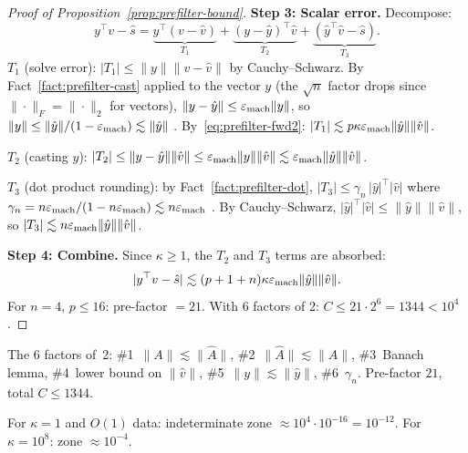 \begin{unverified}
\begin{proof}[Proof of Proposition~\ref{prop:prefilter-bound}]
\medskip\noindent\textbf{Step 3: Scalar error.}
Decompose:
\[
  y^\top v - \hat{s}
  = \underbrace{y^\top(v - \hat{v})}_{T_1}
  + \underbrace{(y - \hat{y})^\top\hat{v}}_{T_2}
  + \underbrace{(\hat{y}^\top\hat{v} - \hat{s})}_{T_3}.
\]
\emph{$T_1$} (solve error):
$|T_1| \le \|y\|\|v - \hat{v}\|$
by Cauchy--Schwarz.
By Fact~\ref{fact:prefilter-cast} applied to the vector $y$
(the $\sqrt{n}$ factor drops since $\|\cdot\|_F = \|\cdot\|_2$
for vectors),
$\|y - \hat{y}\| \le \varepsilon_{\mathrm{mach}}\|y\|$,
so $\|y\| \le \|\hat{y}\|/(1 - \varepsilon_{\mathrm{mach}}) \lesssim \|\hat{y}\|$
\quad[$\lesssim$ \#5].
By~\eqref{eq:prefilter-fwd2}:
$|T_1| \lesssim p\kappa\varepsilon_{\mathrm{mach}}\|\hat{y}\|\|\hat{v}\|$.

\emph{$T_2$} (casting $y$):
$|T_2| \le \|y - \hat{y}\|\|\hat{v}\|
\le \varepsilon_{\mathrm{mach}}\|y\|\|\hat{v}\|
\lesssim \varepsilon_{\mathrm{mach}}\|\hat{y}\|\|\hat{v}\|$.

\emph{$T_3$} (dot product rounding):
by Fact~\ref{fact:prefilter-dot},
$|T_3| \le \gamma_n\, |\hat{y}|^\top|\hat{v}|$
where $\gamma_n = n\varepsilon_{\mathrm{mach}}/(1 - n\varepsilon_{\mathrm{mach}}) \lesssim n\varepsilon_{\mathrm{mach}}$
\quad[$\lesssim$ \#6].
By Cauchy--Schwarz, $|\hat{y}|^\top|\hat{v}| \le \|\hat{y}\|\|\hat{v}\|$,
so $|T_3| \lesssim n\varepsilon_{\mathrm{mach}}\|\hat{y}\|\|\hat{v}\|$.

\medskip\noindent\textbf{Step 4: Combine.}
Since $\kappa \ge 1$, the $T_2$ and $T_3$ terms
are absorbed:
\[
  |y^\top v - \hat{s}|
  \lesssim (p + 1 + n)\kappa\varepsilon_{\mathrm{mach}}\|\hat{y}\|\|\hat{v}\|.
\]
For $n = 4$, $p \le 16$: pre-factor $= 21$.
With 6 factors of 2: $C \le 21 \cdot 2^6 = 1344 < 10^4$.
\end{proof}
\end{unverified}

\begin{unverified}
\begin{remark}\label{rem:prefilter-constants}
The 6 factors of~2:
\#1~$\|A\| \lesssim \|\hat{A}\|$,
\#2~$\|\hat{A}\| \lesssim \|A\|$,
\#3~Banach lemma,
\#4~lower bound on $\|\hat{v}\|$,
\#5~$\|y\| \lesssim \|\hat{y}\|$,
\#6~$\gamma_n$.
Pre-factor $21$, total $C \le 1344$.

For $\kappa = 1$ and $O(1)$ data:
indeterminate zone $\approx 10^4 \cdot 10^{-16} = 10^{-12}$.
For $\kappa = 10^8$: zone $\approx 10^{-4}$.
\end{remark}
\end{unverified}


